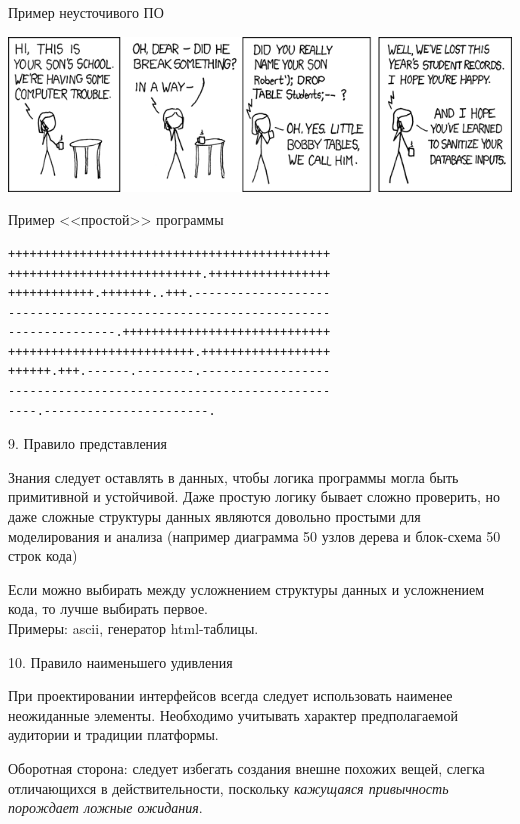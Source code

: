 \begin{frame}{Пример неусточивого ПО}
	\begin{center}
		\includegraphics[width=1\textwidth]{exploits_of_a_mom.png}
	\end{center}
\end{frame}


\begin{frame}[fragile]{Пример <<простой>> программы}
	\begin{center}
		\begin{verbatim}
+++++++++++++++++++++++++++++++++++++++++++++
+++++++++++++++++++++++++++.+++++++++++++++++
++++++++++++.+++++++..+++.-------------------
---------------------------------------------
---------------.+++++++++++++++++++++++++++++
++++++++++++++++++++++++++.++++++++++++++++++
++++++.+++.------.--------.------------------
---------------------------------------------
----.-----------------------.
		\end{verbatim}
	\end{center}
\end{frame}

\begin{frame}{9. Правило представления}
	\begin{block}{Знания следует оставлять в данных,  чтобы логика программы могла быть примитивной и устойчивой.}
		\pause
		Даже простую логику бывает сложно проверить,  но даже сложные структуры данных являются довольно простыми для моделирования и анализа (например диаграмма 50 узлов дерева и блок-схема 50 строк кода)
	\end{block}
	\pause
	Если можно выбирать между усложнением структуры данных и усложнением кода,  то лучше выбирать первое.\\
	Примеры: ascii,  генератор html-таблицы.
\end{frame}

\begin{frame}{10. Правило наименьшего удивления}
	\begin{block}{При проектировании интерфейсов всегда следует использовать наименее неожиданные элементы.}
		\pause
		Необходимо учитывать характер предполагаемой аудитории и традиции платформы.
	\end{block}
	\pause
	Оборотная сторона: следует избегать создания внешне похожих вещей,  слегка отличающихся в действительности,  поскольку {\itshape кажущаяся привычность порождает ложные ожидания}.
\end{frame}

